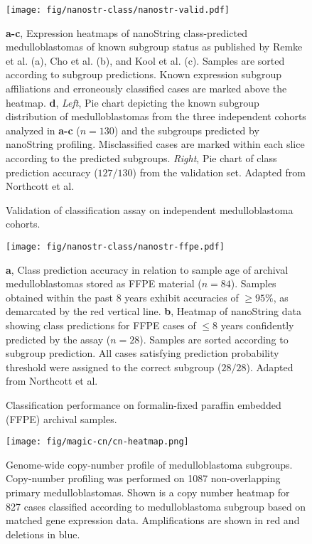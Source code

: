 \documentclass[11pt,letterpaper]{article}
\theoremstyle{definition}
\begin{document}
\begin{figure}[h]
	\begin{center}
		\texttt{[image: fig/nanostr-class/nanostr-valid.pdf]}
	\end{center}
	\caption{Validation of classification assay on independent medulloblastoma cohorts.}
	\textbf{a-c}, Expression heatmaps of nanoString class-predicted medulloblastomas of known subgroup status as published by Remke et al. (a), Cho et al. (b), and Kool et al. (c). Samples are sorted according to subgroup predictions. Known expression subgroup affiliations and erroneously classified cases are marked above the heatmap. \textbf{d}, \emph{Left}, Pie chart depicting the known subgroup distribution of medulloblastomas from the three independent cohorts analyzed in \textbf{a-c} ($n = 130$) and the subgroups predicted by nanoString profiling. Misclassified cases are marked within each slice according to the predicted subgroups. \emph{Right}, Pie chart of class prediction accuracy ($127/130$) from the validation set. Adapted from Northcott et al.
	\label{fig:nanostr-valid}
\end{figure}

\begin{figure}[h]
	\begin{center}
		\texttt{[image: fig/nanostr-class/nanostr-ffpe.pdf]}
	\end{center}
	\caption{Classification performance on formalin-fixed paraffin embedded (FFPE) archival samples.}
	\textbf{a}, Class prediction accuracy in relation to sample age of archival medulloblastomas stored as FFPE material ($n = 84$). Samples obtained within the past 8 years exhibit accuracies of $\geq 95\%$, as demarcated by the red vertical line. \textbf{b}, Heatmap of nanoString data showing class predictions for FFPE cases of $\leq 8$ years confidently predicted by the assay ($n = 28$). Samples are sorted according to subgroup prediction. All cases satisfying prediction probability threshold were assigned to the correct subgroup ($28/28$). Adapted from Northcott et al.
	\label{fig:nanostr-ffpe}
\end{figure}

\clearpage

\begin{SCfigure}
	\centering
	\texttt{[image: fig/magic-cn/cn-heatmap.png]}
	\caption{Genome-wide copy-number profile of medulloblastoma subgroups.
	Copy-number profiling was performed on 1087 non-overlapping primary medulloblastomas. Shown is a copy number heatmap for 827 cases classified according to medulloblastoma subgroup based on matched gene expression data.  Amplifications are shown in red and deletions in blue.}
	\label{fig:cn-heatmap}
\end{SCfigure}
\end{document}
